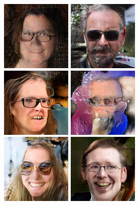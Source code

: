 \begin{figure}[!h]
    \begin{subfigure}[b]{\textwidth}
        \centerline{
            \includegraphics[scale=0.485]{figures/ffhq/forced-glasses-yes/ffhq128x128_glasses_yes0000.png}
            \includegraphics[scale=0.485]{figures/ffhq/forced-glasses-yes/ffhq128x128_glasses_yes0001.png}
            \includegraphics[scale=0.485]{figures/ffhq/forced-glasses-yes/ffhq128x128_glasses_yes0002.png}
            \includegraphics[scale=0.485]{figures/ffhq/forced-glasses-yes/ffhq128x128_glasses_yes0003.png}
            \includegraphics[scale=0.485]{figures/ffhq/forced-glasses-yes/ffhq128x128_glasses_yes0004.png}
            \includegraphics[scale=0.485]{figures/ffhq/forced-glasses-yes/ffhq128x128_glasses_yes0005.png}
}
\end{subfigure}
\end{figure}
